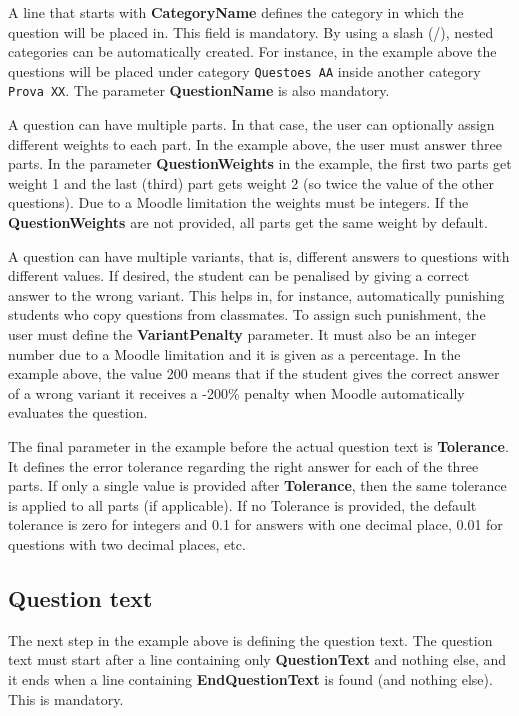 \documentclass[11pt]{article}
\begin{document}
A line that starts with {\bf CategoryName} defines the category in which the question will be placed in. This field is mandatory. By using a slash (/), nested categories can be automatically created. For instance, in the example above the questions will be placed under category \texttt{Questoes AA} inside another category \texttt{Prova XX}. The parameter {\bf QuestionName} is also mandatory.

A question can have multiple parts. In that case, the user can optionally assign different weights to each part. In the example above, the user must answer three parts. In the parameter {\bf QuestionWeights} in the example, the first two parts get weight 1 and the last (third) part gets weight 2 (so twice the value of the other questions). Due to a Moodle limitation the weights must be integers. If the {\bf QuestionWeights} are not provided, all parts get the same weight by default.

A question can have multiple variants, that is, different answers to questions with different values. If desired, the student can be penalised by giving a correct answer to the wrong variant. This helps in, for instance, automatically punishing students who copy questions from classmates. To assign such punishment, the user must define the {\bf VariantPenalty} parameter. It must also be an integer number due to a Moodle limitation and it is given as a percentage. In the example above, the value 200 means that if the student gives the correct answer of a wrong variant it receives a -200\% penalty when Moodle automatically evaluates the question.

The final parameter in the example before the actual question text is {\bf Tolerance}. It defines the error tolerance regarding the right answer for each of the three parts. If only a single value is provided after {\bf Tolerance}, then the same tolerance is applied to all parts (if applicable). If no Tolerance is provided, the default tolerance is zero for integers and 0.1 for answers with one decimal place, 0.01 for questions with two decimal places, etc.

\subsection{Question text}

The next step in the example above is defining the question text. The question text must start after a line containing only {\bf QuestionText} and nothing else, and it ends when a line containing {\bf EndQuestionText} is found (and nothing else). This is mandatory. 
\end{document}
